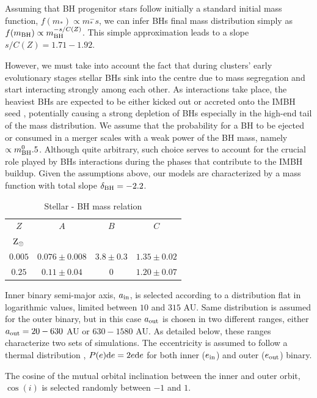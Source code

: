 \documentclass[useAMS,usenatbib]{mn2e}
\newcommand{\Zs}{{\rm Z}_\odot}
\newcommand{\inn}{{\rm in}}
\newcommand{\out}{{\rm out}}
\newcommand{\bh}{{\rm BH}}
\begin{document}
Assuming that BH progenitor stars follow initially a standard \cite{kroupa01} initial mass function, $f(m_*) \propto m_*^-s$, we can infer BHs final mass distribution simply as $f(m_\bh)\propto m_\bh^{-s/C(Z)}$. This simple approximation leads to a slope $s/C(Z) = 1.71-1.92$. 

However, we must take into account the fact that during clusters' early evolutionary stages stellar BHs sink into the centre due to mass segregation and start interacting strongly among each other.
As interactions take place, the heaviest BHs are expected to be either kicked out or accreted onto the IMBH seed \citep{giersz15,AAG18a}, potentially causing a strong depletion of BHs especially in the high-end tail of the mass distribution. We assume that the probability for a BH to be ejected or consumed in a merger scales with a weak power of the BH mass, namely $ \propto m_\bh^0.5$. Although quite arbitrary, such choice serves to account for the crucial role played by BHs interactions during the phases that contribute to the IMBH buildup. Given the assumptions above, our models are characterized by a mass function with total slope $\delta_\bh = -2.2$.

\begin{table}
    \centering
    \caption{Stellar - BH mass relation}
    \begin{tabular}{cccc}
        \hline
        \hline
        $Z$ & $A$ & $B$ & $C$ \\
        $\Zs$   &  & &  \\
    \hline    
        $0.005 $& $0.076\pm0.008$ & $3.8\pm0.3$ & $1.35\pm0.02$\\
        $0.25$  & $0.11\pm0.04$   & $0  $       & $1.20\pm0.07$\\
    \hline
    \end{tabular}
    \label{tab:t1}
\end{table}

Inner binary semi-major axis, $a_\inn$, is selected according to a distribution flat in logarithmic values, limited between $10$ and $315$ AU. Same distribution is assumed for the outer binary, but in this case $a_\out$ is chosen in two different ranges, either $a_\out=20-630$ AU or $630-1580$ AU. As detailed below, these ranges characterize two sets of simulations.
The eccentricity is assumed to follow a thermal distribution \citep{jeans19}, $P(e){\rm d}e = 2e{\rm d}e$ for both inner ($e_\inn$) and outer ($e_\out$) binary.

The cosine of the mutual orbital inclination between the inner and outer orbit, $\cos(i)$ is selected randomly between $-1$ and $1$.
\end{document}
